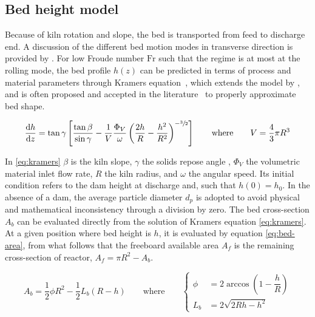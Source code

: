 \documentclass[11pt]{paper}
\begin{document}
\subsection{Bed height model}

Because of kiln rotation and slope, the bed is transported from feed to discharge end. A discussion of the different bed motion modes in transverse direction is provided by \textcite{Boateng2016}. For low Froude number $\mathrm{Fr}$ such that the regime is at most at the rolling mode, the bed profile $h(z)$ can be predicted in terms of process and material parameters through Kramers equation~\cite{Kramers1952}, which extends the model by \textcite{Vahl1952}, and is often proposed and accepted in the literature~\cite{Mujumdar2006i,Mujumdar2006ii,Kussel2009} to properly approximate bed shape.

\begin{equation}
\frac{\mathrm{d}h}{\mathrm{d}z}=
\tan{\gamma}
\left[
    \frac{\tan{\beta}}{\sin{\gamma}}-
    \frac{1}{V}
    \frac{\Phi_{V}}{\omega}
    \left(
        \frac{2h}{R}-\frac{h^2}{R^2}
    \right)^{-\sfrac{3}{2}}
\right]
\qquad\text{where}\qquad
V=\frac{4}{3}\pi{}R^3
\label{eq:kramers}
\end{equation}

In \eqref{eq:kramers} $\beta$ is the kiln slope, $\gamma$ the solids repose angle , $\Phi_{V}$ the volumetric material inlet flow rate, $R$ the kiln radius, and $\omega$ the angular speed. Its initial condition refers to the dam height at discharge and, such that $h(0)=h_{0}$. In the absence of a dam, the average particle diameter $d_{p}$ is adopted to avoid physical and mathematical inconsistency through a division by zero. The bed cross-section $A_{b}$ can be evaluated directly from the solution of Kramers equation \eqref{eq:kramers}\cite{Mujumdar2006i,Mujumdar2006ii,Kussel2009}. At a given position where bed height is $h$, it is evaluated by equation \eqref{eq:bed-area}, from what follows that the freeboard available area $A_{f}$ is the remaining cross-section of reactor, $A_{f}=\pi{}R^2-A_{b}$.

\begin{equation}
    A_{b}=
    \frac{1}{2}\phi{}R^2-
    \frac{1}{2}L_{b}(R-h)\qquad\text{where}\qquad
    \begin{cases}
        \phi    &=2\arccos{\left(1-\dfrac{h}{R}\right)}\\[8pt]
        L_{b}   &=2\sqrt{2Rh-h^2} 
    \end{cases}
    \label{eq:bed-area}
\end{equation}
\end{document}
